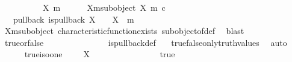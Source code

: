\begin{isabellebody}
\ \ \isamarkupfalse%
\ {\isacharminus}{\kern0pt}\isanewline
\ \ \ \ \isamarkupfalse%
\ X\ m\isanewline
\ \ \ \ \isamarkupfalse%
\ X{\isacharunderscore}{\kern0pt}m{\isacharunderscore}{\kern0pt}subobject{\isacharcolon}{\kern0pt}\ {\isachardoublequoteopen}{\isacharparenleft}{\kern0pt}X{\isacharcomma}{\kern0pt}\ m{\isacharparenright}{\kern0pt}\ {\isasymsubseteq}\isactrlsub c\ {\isasymone}{\isachardoublequoteclose}\isanewline
\isanewline
\ \ \ \ \isamarkupfalse%
\ {\isasymchi}\ \ {\isasymchi}{\isacharunderscore}{\kern0pt}pullback{\isacharcolon}{\kern0pt}\ {\isachardoublequoteopen}is{\isacharunderscore}{\kern0pt}pullback\ X\ {\isasymone}\ {\isasymone}\ {\isasymOmega}\ {\isacharparenleft}{\kern0pt}{\isasymbeta}\isactrlbsub X\isactrlesub {\isacharparenright}{\kern0pt}\ {\isasymt}\ m\ {\isasymchi}{\isachardoublequoteclose}\isanewline
\ \ \ \ \ \ \isamarkupfalse%
\ X{\isacharunderscore}{\kern0pt}m{\isacharunderscore}{\kern0pt}subobject\ characteristic{\isacharunderscore}{\kern0pt}function{\isacharunderscore}{\kern0pt}exists\ subobject{\isacharunderscore}{\kern0pt}of{\isacharunderscore}{\kern0pt}def{}\ \isamarkupfalse%
\ blast\isanewline
\ \ \ \ \isamarkupfalse%
\ \isamarkupfalse%
\ {\isasymchi}{\isacharunderscore}{\kern0pt}true{\isacharunderscore}{\kern0pt}or{\isacharunderscore}{\kern0pt}false{\isacharcolon}{\kern0pt}\ {\isachardoublequoteopen}{\isasymchi}\ {\isacharequal}{\kern0pt}\ {\isasymt}\ {\isasymor}\ {\isasymchi}\ {\isacharequal}{\kern0pt}\ {\isasymf}{\isachardoublequoteclose}\isanewline
\ \ \ \ \ \ \isamarkupfalse%
\ is{\isacharunderscore}{\kern0pt}pullback{\isacharunderscore}{\kern0pt}def\ \ \isamarkupfalse%
\ true{\isacharunderscore}{\kern0pt}false{\isacharunderscore}{\kern0pt}only{\isacharunderscore}{\kern0pt}truth{\isacharunderscore}{\kern0pt}values\ \isamarkupfalse%
\ auto\isanewline
\isanewline
\ \ \ \ \isamarkupfalse%
\ true{\isacharunderscore}{\kern0pt}iso{\isacharunderscore}{\kern0pt}one{\isacharcolon}{\kern0pt}\ {\isachardoublequoteopen}{\isasymchi}\ {\isacharequal}{\kern0pt}\ {\isasymt}\ {\isasymLongrightarrow}\ X\ {\isasymcong}\ {\isasymone}{\isachardoublequoteclose}\isanewline
\ \ \ \ \isamarkupfalse%
\ {\isacharminus}{\kern0pt}\isanewline
\ \ \ \ \ \ \isamarkupfalse%
\ {\isasymchi}{\isacharunderscore}{\kern0pt}true{\isacharcolon}{\kern0pt}\ {\isachardoublequoteopen}{\isasymchi}\ {\isacharequal}{\kern0pt}\ {\isasymt}{\isachardoublequoteclose}\isanewline

\end{isabellebody}
